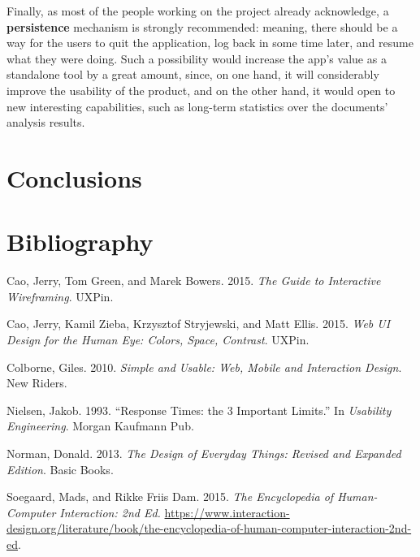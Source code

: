 \documentclass[12pt,oneside,svgnames]{memoir}
\begin{document}
Finally, as most of the people working on the project already
acknowledge, a \textbf{persistence} mechanism is strongly recommended:
meaning, there should be a way for the users to quit the application,
log back in some time later, and resume what they were doing. Such a
possibility would increase the app's value as a standalone tool by a
great amount, since, on one hand, it will considerably improve the
usability of the product, and on the other hand, it would open to new
interesting capabilities, such as long-term statistics over the
documents' analysis results.

\chapter*{Conclusions}\label{conclusions}

\chapter*{Bibliography}\label{bibliography}


Cao, Jerry, Tom Green, and Marek Bowers. 2015. \emph{The Guide to
Interactive Wireframing}. UXPin.

Cao, Jerry, Kamil Zieba, Krzysztof Stryjewski, and Matt Ellis. 2015.
\emph{Web UI Design for the Human Eye: Colors, Space, Contrast}. UXPin.

Colborne, Giles. 2010. \emph{Simple and Usable: Web, Mobile and
Interaction Design}. New Riders.

Nielsen, Jakob. 1993. ``Response Times: the 3 Important Limits.'' In
\emph{Usability Engineering}. Morgan Kaufmann Pub.

Norman, Donald. 2013. \emph{The Design of Everyday Things: Revised and
Expanded Edition}. Basic Books.

Soegaard, Mads, and Rikke Friis Dam. 2015. \emph{The Encyclopedia of
Human-Computer Interaction: 2nd Ed.}
\url{https://www.interaction-design.org/literature/book/the-encyclopedia-of-human-computer-interaction-2nd-ed}.
\end{document}
